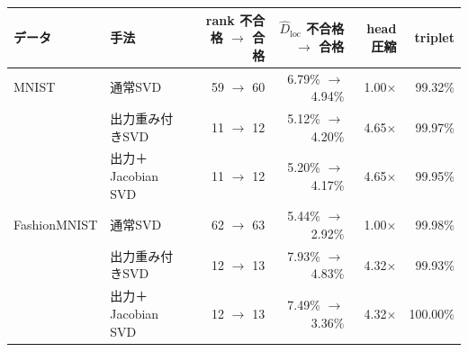 \begin{tabular}{llrrrr}
\toprule
データ & 手法 & rank 不合格 $\to$ 合格 & $\widehat D_{\mathrm{loc}}$ 不合格 $\to$ 合格 & head圧縮 & triplet \\
\midrule
MNIST & 通常SVD & 59 $\to$ 60 & 6.79\% $\to$ 4.94\% & 1.00$\times$ & 99.32\% \\
 & 出力重み付きSVD & 11 $\to$ 12 & 5.12\% $\to$ 4.20\% & 4.65$\times$ & 99.97\% \\
 & 出力＋Jacobian SVD & 11 $\to$ 12 & 5.20\% $\to$ 4.17\% & 4.65$\times$ & 99.95\% \\
\addlinespace
FashionMNIST & 通常SVD & 62 $\to$ 63 & 5.44\% $\to$ 2.92\% & 1.00$\times$ & 99.98\% \\
 & 出力重み付きSVD & 12 $\to$ 13 & 7.93\% $\to$ 4.83\% & 4.32$\times$ & 99.93\% \\
 & 出力＋Jacobian SVD & 12 $\to$ 13 & 7.49\% $\to$ 3.36\% & 4.32$\times$ & 100.00\% \\
\bottomrule
\end{tabular}
